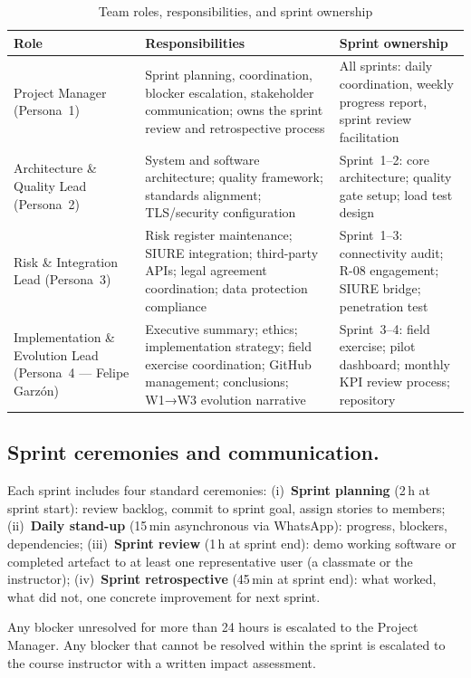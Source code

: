 \documentclass[12pt,a4paper]{article}
\begin{document}
\begin{table}[h]
\caption{Team roles, responsibilities, and sprint ownership}
\label{tab:roles}
\centering
\begin{tabularx}{\textwidth}{lXX}
\toprule
\textbf{Role} & \textbf{Responsibilities} & \textbf{Sprint ownership} \\
\midrule
Project Manager (Persona~1) & Sprint planning, coordination, blocker escalation, stakeholder communication; owns the sprint review and retrospective process & All sprints: daily coordination, weekly progress report, sprint review facilitation \\
Architecture \& Quality Lead (Persona~2) & System and software architecture; quality framework; standards alignment; TLS/security configuration & Sprint~1--2: core architecture; quality gate setup; load test design \\
Risk \& Integration Lead (Persona~3) & Risk register maintenance; SIURE integration; third-party APIs; legal agreement coordination; data protection compliance & Sprint~1--3: connectivity audit; R-08 engagement; SIURE bridge; penetration test \\
Implementation \& Evolution Lead (Persona~4 --- Felipe Garzón) & Executive summary; ethics; implementation strategy; field exercise coordination; GitHub management; conclusions; W1→W3 evolution narrative & Sprint~3--4: field exercise; pilot dashboard; monthly KPI review process; repository \\
\bottomrule
\end{tabularx}
\end{table}

\subsection{Sprint ceremonies and communication.}
Each sprint includes four standard ceremonies:
(i)~\textbf{Sprint planning} (2\,h at sprint start): review backlog,
commit to sprint goal, assign stories to members;
(ii)~\textbf{Daily stand-up} (15\,min asynchronous via WhatsApp):
progress, blockers, dependencies;
(iii)~\textbf{Sprint review} (1\,h at sprint end): demo working
software or completed artefact to at least one representative
user (a classmate or the instructor);
(iv)~\textbf{Sprint retrospective} (45\,min at sprint end): what
worked, what did not, one concrete improvement for next sprint.

Any blocker unresolved for more than 24 hours is escalated to the
Project Manager. Any blocker that cannot be resolved within the
sprint is escalated to the course instructor with a written impact
assessment.
\end{document}
